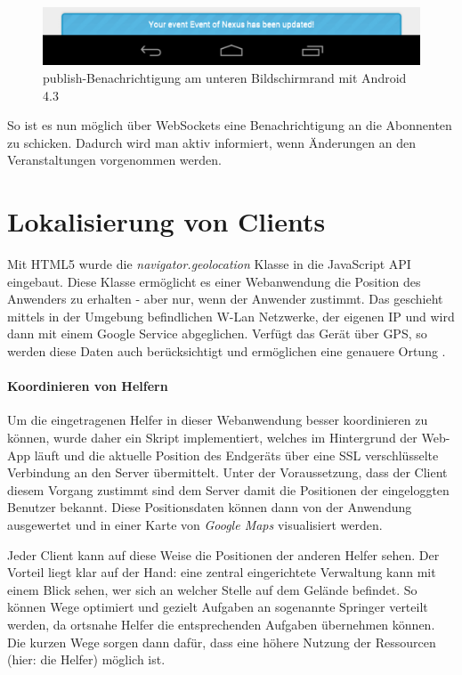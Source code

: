 \begin{figure}[!ht]
	\centering
	\includegraphics[width=15cm]{fig/noty_android}
	\caption{publish-Benachrichtigung am unteren Bildschirmrand mit Android 4.3}
\end{figure}

So ist es nun möglich über WebSockets eine Benachrichtigung an die Abonnenten zu schicken. Dadurch wird man aktiv informiert, wenn Änderungen an den Veranstaltungen vorgenommen werden. 


\section{Lokalisierung von Clients}
Mit HTML5 wurde die \emph{navigator.geolocation} Klasse in die JavaScript API eingebaut. Diese Klasse ermöglicht es einer Webanwendung die Position des Anwenders zu erhalten - aber nur, wenn der Anwender zustimmt. Das geschieht mittels in der Umgebung befindlichen W-Lan Netzwerke, der eigenen IP und wird dann mit einem Google Service abgeglichen. Verfügt das Gerät über GPS, so werden diese Daten auch berücksichtigt und ermöglichen eine genauere Ortung \cite[1. Absatz]{html5:geolocations}.

\paragraph{Koordinieren von Helfern}
Um die eingetragenen Helfer in dieser Webanwendung besser koordinieren zu können, wurde daher ein Skript implementiert, welches im Hintergrund der Web-App läuft und die aktuelle Position des Endgeräts über eine SSL verschlüsselte Verbindung an den Server übermittelt. Unter der Voraussetzung, dass der Client diesem Vorgang zustimmt sind dem Server damit die Positionen der eingeloggten Benutzer bekannt. Diese Positionsdaten können dann von der Anwendung ausgewertet und in einer Karte von \emph{Google Maps} \cite{google:maps} visualisiert werden.\par

Jeder Client kann auf diese Weise die Positionen der anderen Helfer sehen. Der Vorteil liegt klar auf der Hand: eine zentral eingerichtete Verwaltung kann mit einem Blick sehen, wer sich an welcher Stelle auf dem Gelände befindet. So können Wege optimiert und gezielt Aufgaben an sogenannte Springer verteilt werden, da ortsnahe Helfer die entsprechenden Aufgaben übernehmen können. Die kurzen Wege sorgen dann dafür, dass eine höhere Nutzung der Ressourcen (hier: die Helfer) möglich ist.\par


